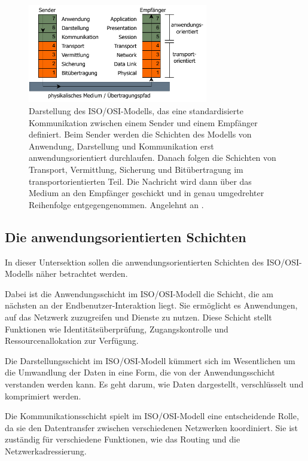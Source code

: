 \begin{figure}
	\centering
	\includegraphics[width=0.7\textwidth]{images/OSI.pdf}
	\caption[OSI-Modell]{Darstellung des ISO/OSI-Modells, das eine standardisierte Kommunikation zwischen einem Sender und einem Empfänger definiert. 
	Beim Sender werden die Schichten des Modells von Anwendung, Darstellung und Kommunikation erst anwendungsorientiert durchlaufen. 
	Danach folgen die Schichten von Transport, Vermittlung, Sicherung und Bitübertragung im transportorientierten Teil. 
	Die Nachricht wird dann über das Medium an den Empfänger geschickt und in genau umgedrehter Reihenfolge entgegengenommen. Angelehnt an \cite{osi-model}.}
	\label{fig:osi_modell}
\end{figure}

\subsection{Die anwendungsorientierten Schichten}

In dieser Untersektion sollen die anwendungsorientierten Schichten des ISO/OSI-Modells näher betrachtet werden. 

Dabei ist die Anwendungsschicht im ISO/OSI-Modell die Schicht, die am nächsten an der Endbenutzer-Interaktion liegt. 
Sie ermöglicht es Anwendungen, auf das Netzwerk zuzugreifen und Dienste zu nutzen. 
Diese Schicht stellt Funktionen wie Identitätsüberprüfung, Zugangskontrolle und Ressourcenallokation zur Verfügung.

Die Darstellungsschicht im ISO/OSI-Modell kümmert sich im Wesentlichen um die Umwandlung der Daten in eine Form, die von der Anwendungsschicht verstanden werden kann. Es geht darum, wie Daten dargestellt, verschlüsselt und komprimiert werden.

Die Kommunikationsschicht spielt im ISO/OSI-Modell eine entscheidende Rolle, da sie den Datentransfer zwischen verschiedenen Netzwerken koordiniert. Sie ist zuständig für verschiedene Funktionen, wie das Routing und die Netzwerkadressierung.

